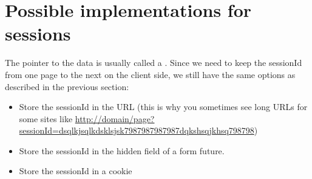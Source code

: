 \documentclass{manual}
\begin{document}
\section{Possible implementations for sessions}
The pointer to the data is usually called a . Since we need to keep the sessionId from one page
to the next on the client side, we still have the same options as described in the previous section:

\begin{itemize}
\item
Store the sessionId in the URL (this is why you sometimes see long URLs for some sites like \url{http://domain/page?sessionId=dsqlkjsqlkdsklsjsk7987987987987dqkshsqjkhsq798798})
\item
Store the sessionId in the hidden field of a form
future.
\item
Store the sessionId in a cookie
\end{itemize}
\end{document}

